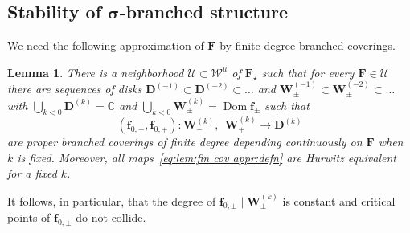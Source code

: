 \documentclass{amsart}
\newcommand{\Dom}{\operatorname {Dom}}
\renewcommand{\sp}{{\ \ }}
\newcommand{\1}{{\mathbb 1 }}
\newcommand{\bF}{{\mathbf F}}
\newcommand{\bW}{{\mathbf W}}
\newcommand{\bD}{{\mathbf D}}
\newcommand{\bbf}{{\mathbf f}}
\newcommand{\str}{{\star}}
\newcommand\Unst{{\boldsymbol{\mathcal{W}}^u}}
\newcommand\bUU{{ \boldsymbol{\mathcal U}}}
\newcommand{\C}{\mathbb{C}}
\newtheorem{lem}[thm]{Lemma}
\theoremstyle{remark}
\numberwithin{equation}{section}
\theoremstyle{definition}
\theoremstyle{nonumberbreak}
\begin{document}
\subsection{Stability of $\boldsymbol\sigma$-branched structure}
\label{ss:impl finct thm}
We need the following approximation of $\bF$ by finite degree branched coverings.
\begin{lem}
\label{lem:fin cov appr}
There is a neighborhood $\bUU \subset \Unst$ of $\bF_\str$ such that for every ${\bF\in \bUU}$ there are sequences of disks $\bD^{(-1)}\subset \bD^{(-2)}\subset \dots $ and $ \bW^{(-1)}_{\pm}\subset  \bW^{(-2)}_{\pm}\subset \dots $ with $\displaystyle{\bigcup _{k<0}\bD^{(k)}=\C}$ and $\displaystyle{\bigcup_{k<0} \bW_\pm ^{(k)}=\Dom \bbf_\pm}$ such that
\begin{equation}
\label{eq:lem:fin cov appr:defn}
(\bbf_{0,-},\bbf_{0,+}) \colon  \bW^{(k)}_{-} ,  \sp \bW^{(k)}_{+} \to \bD^{(k)}
\end{equation}
are proper branched coverings of finite degree depending continuously on $\bF$ when $k$ is fixed. Moreover,  all maps~\eqref{eq:lem:fin cov appr:defn} are Hurwitz equivalent for a fixed $k$. 
\end{lem}
\noindent It follows, in particular, that the degree of $\bbf_{0,\pm }\mid  \bW^{(k)}_{\pm}$ is constant and critical points of $\bbf_{0,\pm }$ do not collide.
\end{document}
